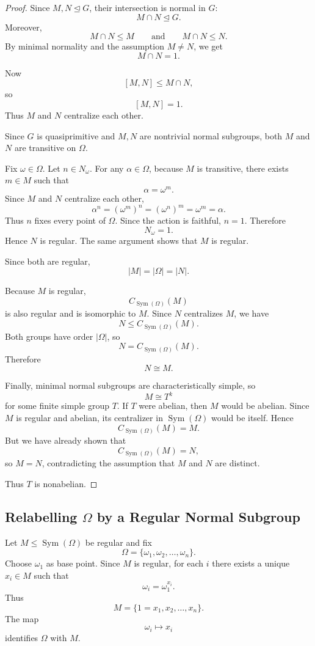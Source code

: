 \begin{proof}
Since \(M,N\unlhd G\), their intersection is normal in \(G\):
\[
    M\cap N\unlhd G.
\]
Moreover,
\[
    M\cap N\leq M
    \qquad\text{and}\qquad
    M\cap N\leq N.
\]
By minimal normality and the assumption \(M\neq N\), we get
\[
    M\cap N=1.
\]

Now
\[
    [M,N]\leq M\cap N,
\]
so
\[
    [M,N]=1.
\]
Thus \(M\) and \(N\) centralize each other.

Since \(G\) is quasiprimitive and \(M,N\) are nontrivial normal subgroups, both \(M\) and
\(N\) are transitive on \(\Omega\).

Fix \(\omega\in\Omega\). Let \(n\in N_\omega\). For any \(\alpha\in\Omega\), because \(M\)
is transitive, there exists \(m\in M\) such that
\[
    \alpha=\omega^m.
\]
Since \(M\) and \(N\) centralize each other,
\[
    \alpha^n
    =
    (\omega^m)^n
    =
    (\omega^n)^m
    =
    \omega^m
    =
    \alpha.
\]
Thus \(n\) fixes every point of \(\Omega\). Since the action is faithful, \(n=1\). Therefore
\[
    N_\omega=1.
\]
Hence \(N\) is regular. The same argument shows that \(M\) is regular.

Since both are regular,
\[
    |M|=|\Omega|=|N|.
\]

Because \(M\) is regular,
\[
    C_{\operatorname{Sym}(\Omega)}(M)
\]
is also regular and is isomorphic to \(M\). Since \(N\) centralizes \(M\), we have
\[
    N\leq C_{\operatorname{Sym}(\Omega)}(M).
\]
Both groups have order \(|\Omega|\), so
\[
    N=C_{\operatorname{Sym}(\Omega)}(M).
\]
Therefore
\[
    N\cong M.
\]

Finally, minimal normal subgroups are characteristically simple, so
\[
    M\cong T^k
\]
for some finite simple group \(T\). If \(T\) were abelian, then \(M\) would be abelian.
Since \(M\) is regular and abelian, its centralizer in \(\operatorname{Sym}(\Omega)\) would be
itself. Hence
\[
    C_{\operatorname{Sym}(\Omega)}(M)=M.
\]
But we have already shown that
\[
    C_{\operatorname{Sym}(\Omega)}(M)=N,
\]
so \(M=N\), contradicting the assumption that \(M\) and \(N\) are distinct.

Thus \(T\) is nonabelian.
\end{proof}

\subsection{Relabelling \texorpdfstring{$\Omega$}{Omega} by a Regular Normal Subgroup}

Let \(M\leq \operatorname{Sym}(\Omega)\) be regular and fix
\[
    \Omega=\{\omega_1,\omega_2,\dots,\omega_n\}.
\]
Choose \(\omega_1\) as base point. Since \(M\) is regular, for each \(i\) there exists a unique
\(x_i\in M\) such that
\[
    \omega_i=\omega_1^{x_i}.
\]
Thus
\[
    M=\{1=x_1,x_2,\dots,x_n\}.
\]
The map
\[
    \omega_i\longmapsto x_i
\]
identifies \(\Omega\) with \(M\).

